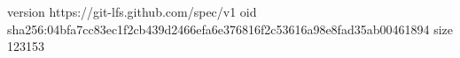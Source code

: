 version https://git-lfs.github.com/spec/v1
oid sha256:04bfa7cc83ec1f2cb439d2466efa6e376816f2c53616a98e8fad35ab00461894
size 123153
